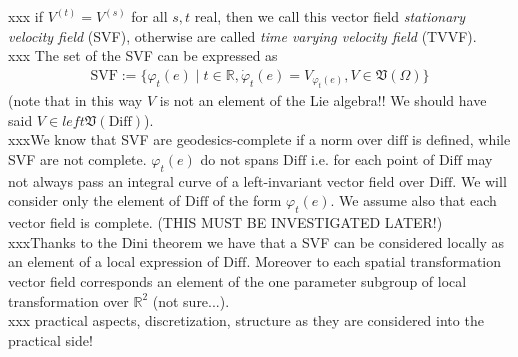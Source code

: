 \noindent
xxx if $V^{(t)} = V^{(s)}$ for all $s,t$ real, then we call this vector field \emph{stationary velocity field} (SVF), otherwise are called \emph{time varying velocity field} (TVVF).\\
xxx The set of the SVF can be expressed as
\begin{align*}
\text{SVF} := \lbrace \varphi_{t}(e) \mid t \in \mathbb{R}, \dot{\varphi}_{t}(e) = V_{\varphi_{t}(e)},  V \in \mathfrak{V}(\Omega) \rbrace
\end{align*}
(note that in this way $V$ is not an element of the Lie algebra!! We should have said $V \in left\mathfrak{V}(\text{Diff})$).\\
xxxWe know that SVF are geodesics-complete if a norm over $\text{diff}$ is defined, while SVF are not complete. $\varphi_{t}(e)$ do not spans $\text{Diff}$ i.e. for each point of $\text{Diff}$ may not always pass an integral curve of a left-invariant vector field over $\text{Diff}$. We will consider only the element of $\text{Diff}$ of the form $\varphi_{t}(e)$. We assume also that each vector field is complete. (THIS MUST BE INVESTIGATED LATER!)\\
xxxThanks to the Dini theorem we have that a SVF can be considered locally as an element of a local expression of $\text{Diff}$.
Moreover to each spatial transformation vector field corresponds an element of the one parameter subgroup of local transformation over $\mathbb{R}^2$ (not sure...).\\

xxx practical aspects, discretization, structure as they are considered into the practical side!





